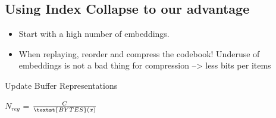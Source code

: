 \documentclass[colorinlistoftodos]{article} %
\begin{document}
\subsection{Using Index Collapse to our advantage}
\begin{itemize}
    \item Start with a high number of embeddings. 
    \item When replaying, reorder and compress the codebook! Underuse of embeddings is not a bad thing for compression --> less bits per items
\end{itemize}


\begin{minipage}{\textwidth}
\begin{minipage}{0.45\textwidth}
\begin{algorithm2e}[H]\small
\SetAlgoLined
  \DontPrintSemicolon
    

 \caption{Update Buffer Representations}
\label{algo:vqr}
    
\end{algorithm2e}
\end{minipage}
\qquad
\begin{minipage}{0.5\textwidth}
\begin{algorithm2e}[H]\small
\SetAlgoLined
  \DontPrintSemicolon
    
    $N_{reg}$ = $\frac{C}{\textst{BYTES}(x)}$
    
    

\end{algorithm2e}
\end{minipage}
\end{minipage}
\end{document}
